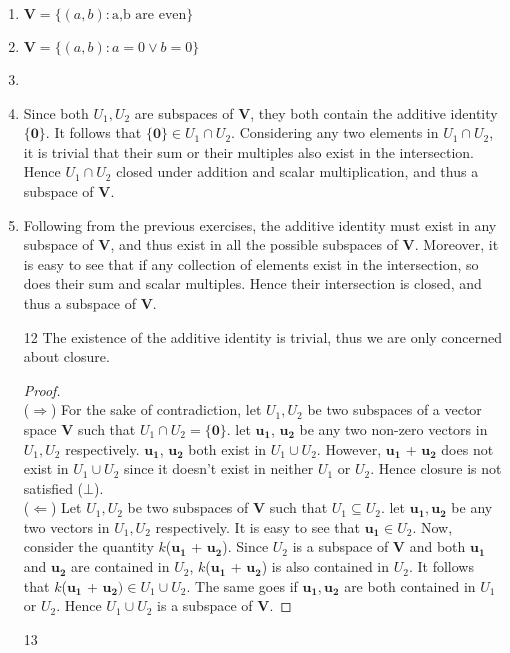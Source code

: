 \documentclass{article}
\begin{document}
\begin{enumerate}
\item $\bm{V} = \{ (a,b): \text{a,b are even} \}$
\item $\bm{V} =  \{ (a,b): a=0 \lor b=0 \}$
\item 
\item Since both $U_{1},U_{2}$ are subspaces of $\bm{V}$, they both contain the additive identity $\{ \bm{0} \}$. It follows that $\{ \bm{0}\} \in U_{1} \cap U_{2}$. Considering any two elements in $U_{1} \cap U_{2}$, it is trivial that their sum or their multiples also exist in the intersection. Hence $U_{1} \cap U_{2}$ closed under addition and scalar multiplication, and thus a subspace of $\bm{V}$.
\item Following from the previous exercises, the additive identity must exist in any subspace of $\bm{V}$, and thus exist in all the possible subspaces of $\bm{V}$. Moreover, it is easy to see that if any collection of elements exist in the intersection, so does their sum and scalar multiples. Hence their intersection is closed, and thus a subspace of $\bm{V}$.

\item[12] The existence of the additive identity is trivial, thus we are only concerned about closure.
\begin{proof} \; \\
($\Rightarrow$)
For the sake of contradiction, let $U_{1}, U_{2}$ be two subspaces of a vector space $\bm{V}$ such that $U_{1} \cap U_{2} = \{ \bm{0} \}$. let $\bm{u_{1}}$, $\bm{u_{2}}$ be any two non-zero vectors in $U_{1},U_{2}$ respectively. $\bm{u_{1}}$, $\bm{u_{2}}$ both exist in $U_{1} \cup U_{2}$. However, $\bm{u_{1}}$ + $\bm{u_{2}}$ does not exist in $U_{1} \cup U_{2}$ since it doesn't exist in neither $U_{1}$ or $U_{2}$. Hence closure is not satisfied ($\bot$). \\
($\Leftarrow$) Let $U_{1}, U_{2}$ be two subspaces of $\bm{V}$ such that $U_{1} \subseteq U_{2}$. let $\bm{u_{1}},\bm{u_{2}}$ be any two vectors in $U_{1}, U_{2}$ respectively. It is easy to see that $\bm{u_{1}} \in U_{2}$. Now, consider the quantity $k$($\bm{u_{1}}$ + $\bm{u_{2}}$). Since $U_{2}$ is a subspace of $\bm{V}$ and both $\bm{u_{1}}$ and $\bm{u_{2}}$ are contained in $U_{2}$, $k$($\bm{u_{1}}$ + $\bm{u_{2}}$) is also contained in $U_{2}$. It follows that $k$($\bm{u_{1}}$ + $\bm{u_{2}})\in U_{1} \cup U_{2}$. The same goes if $\bm{u_{1}, u_{2}}$ are both contained in $U_{1}$ or $U_{2}$. Hence $U_{1} \cup U_{2}$ is a subspace of $\bm{V}$.
\end{proof}
\item[13]


\end{enumerate}
\end{document}
